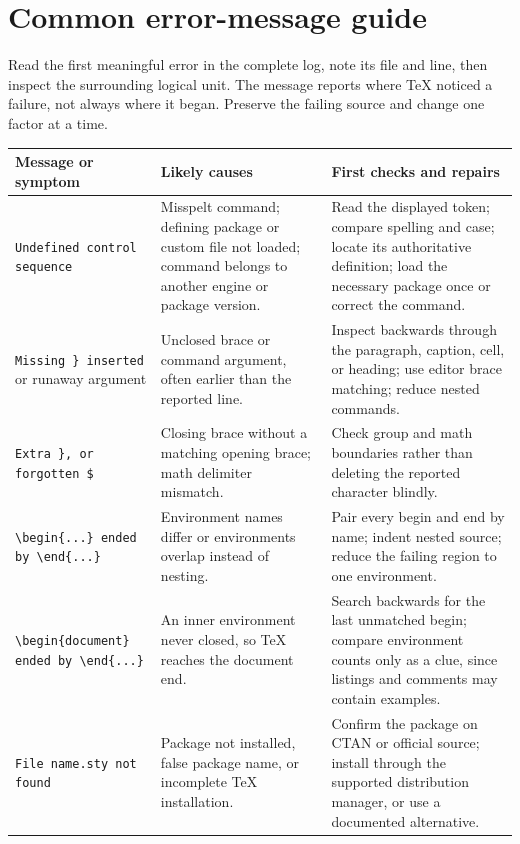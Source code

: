 \chapter*{Common error-message guide}

Read the first meaningful error in the complete log, note its file and line,
then inspect the surrounding logical unit. The message reports where TeX
noticed a failure, not always where it began. Preserve the failing source and
change one factor at a time.

\begin{longtable}{@{}p{}p{}p{}@{}}
\toprule
Message or symptom & Likely causes & First checks and repairs \\
\midrule
\endhead
\texttt{Undefined control sequence} &
Misspelt command; defining package or custom file not loaded; command belongs
to another engine or package version. &
Read the displayed token; compare spelling and case; locate its authoritative
definition; load the necessary package once or correct the command. \\
\addlinespace
\texttt{Missing \} inserted} or runaway argument &
Unclosed brace or command argument, often earlier than the reported line. &
Inspect backwards through the paragraph, caption, cell, or heading; use editor
brace matching; reduce nested commands. \\
\addlinespace
\texttt{Extra \}, or forgotten \$} &
Closing brace without a matching opening brace; math delimiter mismatch. &
Check group and math boundaries rather than deleting the reported character
blindly. \\
\addlinespace
\texttt{\textbackslash begin\{...\} ended by \textbackslash end\{...\}} &
Environment names differ or environments overlap instead of nesting. &
Pair every begin and end by name; indent nested source; reduce the failing
region to one environment. \\
\addlinespace
\texttt{\textbackslash begin\{document\} ended by \textbackslash end\{...\}} &
An inner environment never closed, so TeX reaches the document end. &
Search backwards for the last unmatched begin; compare environment counts only
as a clue, since listings and comments may contain examples. \\
\addlinespace
\texttt{File name.sty not found} &
Package not installed, false package name, or incomplete TeX installation. &
Confirm the package on CTAN or official source; install through the supported
distribution manager, or use a documented alternative. \\

\end{longtable}

